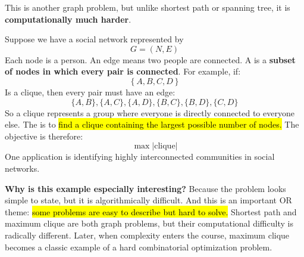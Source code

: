 \highspace
\begin{examplebox}
    This is another graph problem, but unlike shortest path or spanning tree, it is \textbf{computationally much harder}.

    \highspace
    Suppose we have a social network represented by
    \begin{equation*}
        G=(N,E)
    \end{equation*}
    Each node is a person. An edge means two people are connected. A  is a \textbf{subset of nodes in which every pair is connected}. For example, if:
    \begin{equation*}
        \left\{A, B, C, D\right\}
    \end{equation*}
    Is a clique, then every pair must have an edge:
    \begin{equation*}
        \{A,B\}, \{A,C\}, \{A,D\}, \{B,C\}, \{B,D\}, \{C,D\}
    \end{equation*}
    So a clique represents a group where everyone is directly connected to everyone else. The  is to \hl{find a clique containing the largest possible number of nodes.} The objective is therefore:
    \begin{equation*}
        \max \left|\text{clique}\right|
    \end{equation*}
    One application is identifying highly interconnected communities in social networks.

    \highspace
    \textcolor{Green3}{ \textbf{Why is this example especially interesting?}} Because the problem looks simple to state, but it is algorithmically difficult. And this is an important OR theme: \hl{some problems are easy to describe but hard to solve.} Shortest path and maximum clique are both graph problems, but their computational difficulty is radically different. Later, when complexity enters the course, maximum clique becomes a classic example of a hard combinatorial optimization problem.
\end{examplebox}


